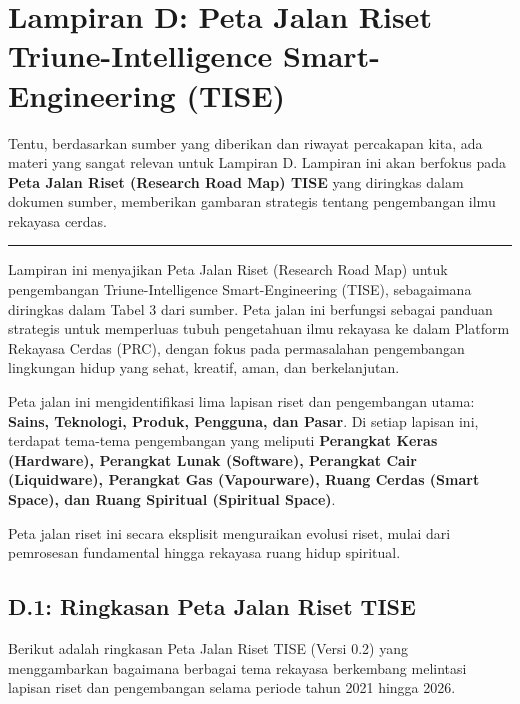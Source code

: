 \documentclass[
  letterpaper,
  DIV=11,
  numbers=noendperiod]{scrreprt}
\begin{document}

\chapter{\texorpdfstring{\textbf{Lampiran D: Peta Jalan Riset
Triune-Intelligence Smart-Engineering
(TISE)}}{Lampiran D: Peta Jalan Riset Triune-Intelligence Smart-Engineering (TISE)}}\label{lampiran-d-peta-jalan-riset-triune-intelligence-smart-engineering-tise}

Tentu, berdasarkan sumber yang diberikan dan riwayat percakapan kita,
ada materi yang sangat relevan untuk Lampiran D. Lampiran ini akan
berfokus pada \textbf{Peta Jalan Riset (Research Road Map) TISE} yang
diringkas dalam dokumen sumber, memberikan gambaran strategis tentang
pengembangan ilmu rekayasa cerdas.

\begin{center}\rule{0.5\linewidth}{0.5pt}\end{center}

Lampiran ini menyajikan Peta Jalan Riset (Research Road Map) untuk
pengembangan Triune-Intelligence Smart-Engineering (TISE), sebagaimana
diringkas dalam Tabel 3 dari sumber. Peta jalan ini berfungsi sebagai
panduan strategis untuk memperluas tubuh pengetahuan ilmu rekayasa ke
dalam Platform Rekayasa Cerdas (PRC), dengan fokus pada permasalahan
pengembangan lingkungan hidup yang sehat, kreatif, aman, dan
berkelanjutan.

Peta jalan ini mengidentifikasi lima lapisan riset dan pengembangan
utama: \textbf{Sains, Teknologi, Produk, Pengguna, dan Pasar}. Di setiap
lapisan ini, terdapat tema-tema pengembangan yang meliputi
\textbf{Perangkat Keras (Hardware), Perangkat Lunak (Software),
Perangkat Cair (Liquidware), Perangkat Gas (Vapourware), Ruang Cerdas
(Smart Space), dan Ruang Spiritual (Spiritual Space)}.

Peta jalan riset ini secara eksplisit menguraikan evolusi riset, mulai
dari pemrosesan fundamental hingga rekayasa ruang hidup spiritual.

\section{\texorpdfstring{\textbf{D.1: Ringkasan Peta Jalan Riset
TISE}}{D.1: Ringkasan Peta Jalan Riset TISE}}\label{d.1-ringkasan-peta-jalan-riset-tise}

Berikut adalah ringkasan Peta Jalan Riset TISE (Versi 0.2) yang
menggambarkan bagaimana berbagai tema rekayasa berkembang melintasi
lapisan riset dan pengembangan selama periode tahun 2021 hingga 2026.
\end{document}
